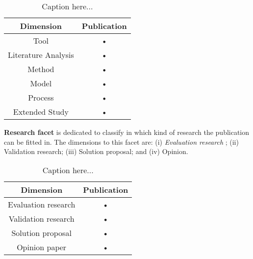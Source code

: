 \begin{description}
\begin{table}[h]
\caption{Caption here...}
\begin{center}
\begin{tabular}{|c|c|}
\hline 
\textbf{Dimension} & \textbf{Publication} \\ 
\hline 
Tool & • \\ 
\hline 
Literature Analysis & • \\ 
\hline 
Method & • \\ 
\hline 
Model & • \\ 
\hline 
Process & • \\ 
\hline 
Extended Study & • \\ 
\hline 
\end{tabular}
\end{center}
\end{table}
\item \textbf{Research facet} is dedicated to classify in which kind of research the publication can be fitted in. The dimensions to this facet are: (i) \textit{Evaluation research} ; (ii) Validation research; (iii) Solution proposal; and (iv) Opinion.
\begin{table}[h]
\caption{Caption here...}
\begin{center}
\begin{tabular}{|c|c|}
\hline 
\textbf{Dimension} & \textbf{Publication} \\ 
\hline 
Evaluation research & • \\ 
\hline 
Validation research & • \\ 
\hline 
Solution proposal & • \\ 
\hline 
Opinion paper & • \\ 
\hline  
\end{tabular}
\end{center}
\end{table}
\end{description}